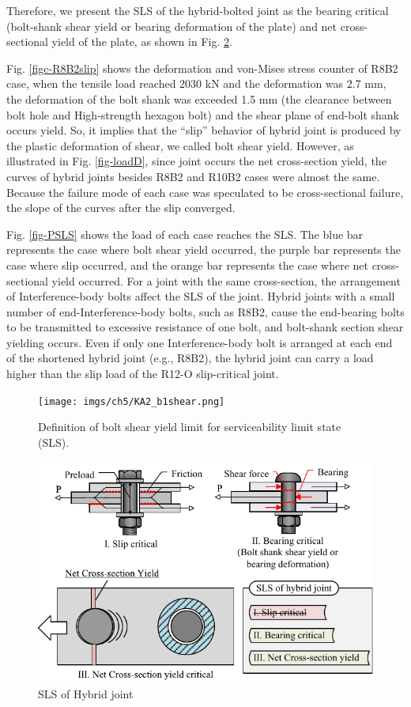 Therefore, we present the SLS of the hybrid-bolted joint as the bearing critical (bolt-shank shear yield or bearing deformation of the plate) and net cross-sectional yield of the plate, as shown in Fig. \ref{fig-slsofhj}.

Fig. \ref{figc-R8B2slip} shows the deformation and von-Mises stress counter of R8B2 case, when the tensile load reached 2030 kN and the deformation was 2.7 mm, the deformation of the bolt shank was exceeded 1.5 mm (the clearance between bolt hole and High-strength hexagon bolt) and the shear plane of end-bolt shank occurs yield. So, it implies that the ``slip'' behavior of hybrid joint is produced by the plastic deformation of shear, we called bolt shear yield. However, as illustrated in Fig. \ref{fig-loadD}, since joint occurs the net cross-section yield, the curves of hybrid joints besides R8B2 and R10B2 cases were almost the same. Because the failure mode of each case was speculated to be cross-sectional failure, the slope of the curves after the slip converged. 

Fig. \ref{fig-PSLS} shows the load of each case reaches the SLS. The blue bar represents the case where bolt shear yield occurred, the purple bar represents the case where slip occurred, and the orange bar represents the case where net cross-sectional yield occurred. For a joint with the same cross-section, the arrangement of Interference-body bolts affect the SLS of the joint. Hybrid joints with a small number of end-Interference-body bolts, such as R8B2, cause the end-bearing bolts to be transmitted to excessive resistance of one bolt, and bolt-shank section shear yielding occurs. Even if only one Interference-body bolt is arranged at each end of the shortened hybrid joint (e.g., R8B2), the hybrid joint can carry a load higher than the slip load of the R12-O slip-critical joint.

\begin{figure}[htbp]
    \centering
    \texttt{[image: imgs/ch5/KA2\_b1shear.png]}
    \caption{Definition of bolt shear yield limit for serviceability limit state (SLS).}
    \label{fig-defboltshear}
\end{figure}

\begin{figure}[htbp]
    \centering
    \includegraphics[width=0.9\linewidth]{imgs/ch5/slsofhybridj.pdf}
    \caption{SLS of Hybrid joint}
    \label{fig-slsofhj}
\end{figure}

